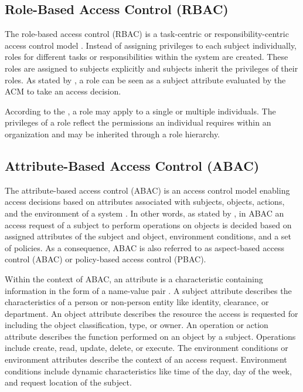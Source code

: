 \subsection{Role-Based Access Control (RBAC)}
The role-based access control (RBAC) is a task-centric or responsibility-centric access control model \cite{Eckert2023}.
Instead of assigning privileges to each subject individually, roles for different tasks or responsibilities within the system are created.
These roles are assigned to subjects explicitly and subjects inherit the privileges of their roles.
As stated by \citeauthor{Hu2014} \cite{Hu2014}, a role can be seen as a subject attribute evaluated by the ACM to take an access decision.

According to the \citeauthor{JTF2020} \cite{JTF2020}, a role may apply to a single or multiple individuals.
The privileges of a role reflect the permissions an individual requires within an organization and may be inherited through a role hierarchy.

\subsection{Attribute-Based Access Control (ABAC)}
The attribute-based access control (ABAC) is an access control model enabling access decisions based on attributes associated with subjects, objects, actions, and the environment of a system \cite{JTF2020}.
In other words, as stated by \citeauthor{Hu2014} \cite{Hu2014}, in ABAC an access request of a subject to perform operations on objects is decided based on assigned attributes of the subject and object, environment conditions, and a set of policies.
As a consequence, ABAC is also referred to as aspect-based access control (ABAC) \cite{Anderson2020} or policy-based access control (PBAC).

Within the context of ABAC, an attribute is a characteristic containing information in the form of a name-value pair \cite{Hu2014}.
A subject attribute describes the characteristics of a person or non-person entity like identity, clearance, or department.
An object attribute describes the resource the access is requested for including the object classification, type, or owner.
An operation or action attribute describes the function performed on an object by a subject.
Operations include create, read, update, delete, or execute.
The environment conditions or environment attributes describe the context of an access request.
Environment conditions include dynamic characteristics like time of the day, day of the week, and request location of the subject.

